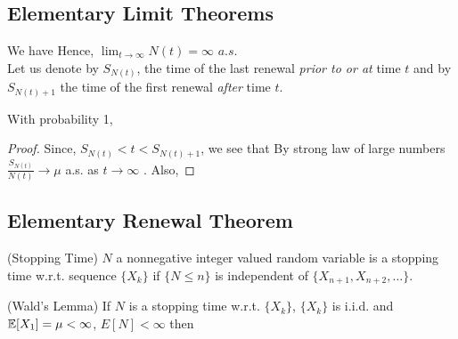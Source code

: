 \documentclass[all-lectures.tex]{subfiles}
\author{}
\begin{document}
\setcounter{chapter}{2}
\setcounter{section}{2}
\section*{}

\subsection{Elementary Limit Theorems}
We have 
Hence, $\lim_{t\to\infty} N(t) = \infty$ $a.s$. \\
\indent Let us denote by $S_{N(t)}$, the time of the last renewal \textit{prior to or at} time $t$ and by $S_{N(t)+1}$ the time of the first renewal \textit{after} time $t$.
\begin{prop}
With probability 1,
\end{prop}
\begin{proof}
Since, $S_{N(t)} < t < S_{N(t)+1}$, we see that
By strong law of large numbers $\frac{S_{N(t)}}{N(t)} \to \mu$ a.s. as $t \to \infty$ . Also,
 \qedhere
\end{proof}

\subsection{Elementary Renewal Theorem}
\begin{defn}
(Stopping Time)
$N$ a nonnegative integer valued random variable is a stopping time w.r.t. sequence $\{X_k\}$ if $\{ N\le n\}$ is independent of $\{X_{n+1}, X_{n+2}, \dots\}$.
\end{defn}
\begin{thm}
(Wald's Lemma)
If $N$ is a stopping time w.r.t. $\{X_k\}$, $\{X_k\}$ is i.i.d. and $\mathbb{E}[X_1] = \mu < \infty$, $E[N] < \infty$ then
\end{thm}
\end{document}
